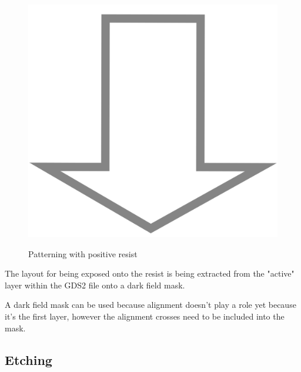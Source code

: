 \begin{figure}[H]
	\centering
	\begin{tikzpicture}[node distance = 3cm, auto, thick,scale=\CrossSectionOnly, every node/.style={transform shape}]
		
	\end{tikzpicture} \\
	\includegraphics[scale=0.01]{down_arrow.png} \\
	\begin{tikzpicture}[node distance = 3cm, auto, thick,scale=\CrossSectionOnly, every node/.style={transform shape}]
		
	\end{tikzpicture}
	\caption{Patterning with positive resist}
\end{figure}

The layout for being exposed onto the resist is being extracted from the "active" layer within the GDS2 file onto a dark field mask.

A dark field mask can be used because alignment doesn't play a role yet because it's the first layer, however the alignment crosses need to be included into the mask.

\newpage

\subsection{Etching}\label{fox_etch}

